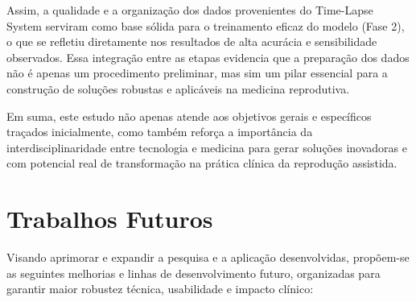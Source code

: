 Assim, a qualidade e a organização dos dados provenientes do Time-Lapse System serviram como base sólida para o treinamento eficaz do modelo (Fase 2), o que se refletiu diretamente nos resultados de alta acurácia e sensibilidade observados. Essa integração entre as etapas evidencia que a preparação dos dados não é apenas um procedimento preliminar, mas sim um pilar essencial para a construção de soluções robustas e aplicáveis na medicina reprodutiva.

Em suma, este estudo não apenas atende aos objetivos gerais e específicos traçados inicialmente, como também reforça a importância da interdisciplinaridade entre tecnologia e medicina para gerar soluções inovadoras e com potencial real de transformação na prática clínica da reprodução assistida.                                                                                                                                                                                                                                    
\section{Trabalhos Futuros}
Visando aprimorar e expandir a pesquisa e a aplicação desenvolvidas, propõem-se as seguintes melhorias e linhas de desenvolvimento futuro, organizadas para garantir maior robustez técnica, usabilidade e impacto clínico:

